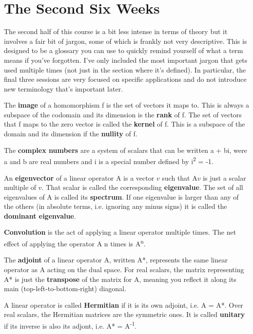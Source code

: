 \documentclass[oneside,english]{amsbook}
\numberwithin{section}{chapter}
\theoremstyle{plain}
\theoremstyle{definition}
\begin{document}
\part{The Second Six Weeks}

The second half of this course is a bit less intense in terms of theory
but it involves a fair bit of jargon, some of which is frankly not very
descriptive. This is designed to be a glossary you can use to quickly
remind yourself of what a term means if you've forgotten. I've only
included the most important jargon that gets used multiple times (not
just in the section where it's defined). In particular, the final three
sessions are very focused on specific applications and do not introduce
new terminology that's important later.

The \textbf{image} of a homomorphism f is the set of vectors it maps to.
This is always a subspace of the codomain and its dimension is the
\textbf{rank} of f. The set of vectors that f maps to the zero vector is
called the \textbf{kernel} of f. This is a subspace of the domain and
its dimension if the \textbf{nullity} of f.

The \textbf{complex numbers} are a system of scalars that can be written
a + bi, were a and b are real numbers and i is a special number defined
by i\textsuperscript{2} = -1.

An \textbf{eigenvector} of a linear operator A is a vector $v$ such
that A$v$ is just a scalar multiple of $v$. That scalar is called
the corresponding \textbf{eigenvalue}. The set of all eigenvalues of A
is called its \textbf{spectrum}. If one eigenvalue is larger than any of
the others (in absolute terms, i.e. ignoring any minus signs) it is
called the \textbf{dominant eigenvalue}.

\textbf{Convolution} is the act of applying a linear operator multiple
times. The net effect of applying the operator A n times is
A\textsuperscript{n}.

The \textbf{adjoint} of a linear operator A, written A*, represents the
same linear operator as A acting on the dual space. For real scalars,
the matrix representing A* is just the \textbf{transpose} of the matrix
for A, meaning you reflect it along its main (top-left-to-bottom-right)
diagonal.

A linear operator is called \textbf{Hermitian} if it is its own adjoint,
i.e. A = A*. Over real scalars, the Hermitian matrices are the symmetric
ones. It is called \textbf{unitary} if its inverse is also its adjont,
i.e. A* = A\textsuperscript{-1}.
\end{document}
